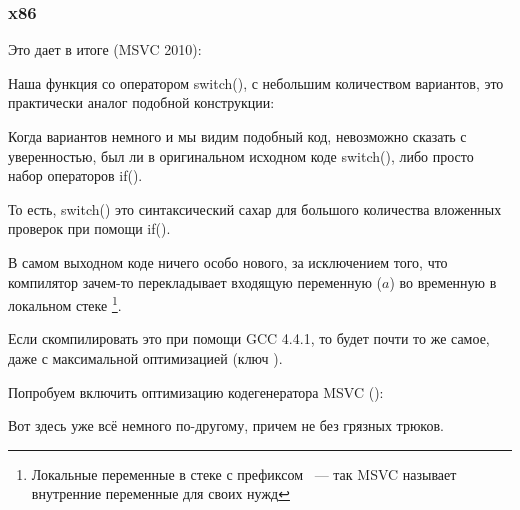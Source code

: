 \subsubsection{x86}


Это дает в итоге (MSVC 2010):



Наша функция со оператором switch(), с небольшим количеством вариантов, 
это практически аналог подобной конструкции:



Когда вариантов немного и мы видим подобный код, невозможно сказать с уверенностью, был ли
в оригинальном исходном коде switch(), либо просто набор операторов if().

\myindex{\SyntacticSugar}
То есть, switch() это синтаксический сахар для большого количества вложенных проверок 
при помощи if().

В самом выходном коде ничего особо нового, 
за исключением того, что компилятор зачем-то 
перекладывает входящую переменную ($a$) во временную в локальном стеке \footnote{Локальные переменные в стеке с префиксом ~--- 
так MSVC называет внутренние переменные для своих нужд}.

Если скомпилировать это при помощи GCC 4.4.1, то будет почти то же самое, даже с максимальной оптимизацией (ключ \Othree).



Попробуем включить оптимизацию кодегенератора MSVC (\Ox): 

\label{JMP_instead_of_RET}


Вот здесь уже всё немного по-другому, причем не без грязных трюков.

